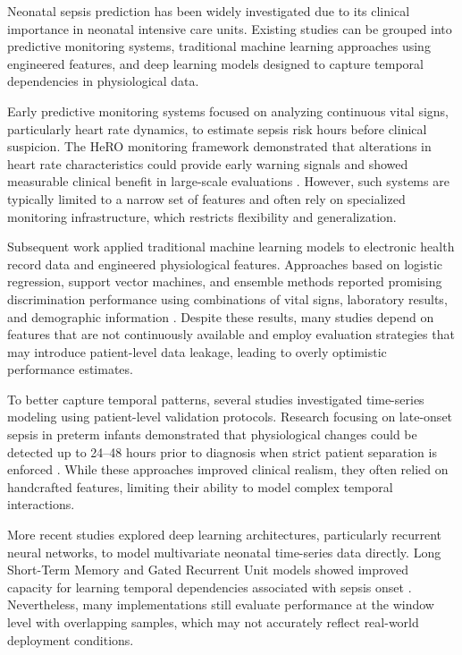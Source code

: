 Neonatal sepsis prediction has been widely investigated due to its clinical importance in neonatal intensive care units. Existing studies can be grouped into predictive monitoring systems, traditional machine learning approaches using engineered features, and deep learning models designed to capture temporal dependencies in physiological data.

Early predictive monitoring systems focused on analyzing continuous vital signs, particularly heart rate dynamics, to estimate sepsis risk hours before clinical suspicion. The HeRO monitoring framework demonstrated that alterations in heart rate characteristics could provide early warning signals and showed measurable clinical benefit in large-scale evaluations \cite{hero_monitoring}. However, such systems are typically limited to a narrow set of features and often rely on specialized monitoring infrastructure, which restricts flexibility and generalization.

Subsequent work applied traditional machine learning models to electronic health record data and engineered physiological features. Approaches based on logistic regression, support vector machines, and ensemble methods reported promising discrimination performance using combinations of vital signs, laboratory results, and demographic information \cite{plos_ehr_sepsis,mbarara_ehr_sepsis}. Despite these results, many studies depend on features that are not continuously available and employ evaluation strategies that may introduce patient-level data leakage, leading to overly optimistic performance estimates.

To better capture temporal patterns, several studies investigated time-series modeling using patient-level validation protocols. Research focusing on late-onset sepsis in preterm infants demonstrated that physiological changes could be detected up to 24–48 hours prior to diagnosis when strict patient separation is enforced \cite{vital_sign_ml,los_ml_mdpi}. While these approaches improved clinical realism, they often relied on handcrafted features, limiting their ability to model complex temporal interactions.

More recent studies explored deep learning architectures, particularly recurrent neural networks, to model multivariate neonatal time-series data directly. Long Short-Term Memory and Gated Recurrent Unit models showed improved capacity for learning temporal dependencies associated with sepsis onset \cite{ehr_rnn_sepsis}. Nevertheless, many implementations still evaluate performance at the window level with overlapping samples, which may not accurately reflect real-world deployment conditions.

